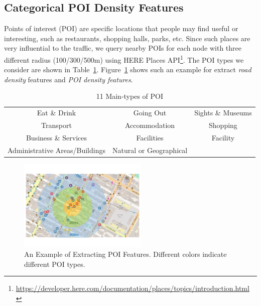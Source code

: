 \subsection{Categorical POI Density Features}
Points of interest (POI) are specific locations that people may find useful or interesting, such as restaurants, shopping halls, parks, etc.
Since such places are very influential to the traffic, we query nearby POIs for each node with three different radius (100/300/500m) using HERE Places API\footnote{\url{https://developer.here.com/documentation/places/topics/introduction.html
}}. 
The POI types we consider are shown in Table~\ref{tbl:poi}.
Figure~\ref{fig:poi} shows such an example for extract \textit{road density} features and\textit{ POI density features}.


\begin{table}[th]
	\small
	\centering
	\caption{11 Main-types of POI}
	\label{tbl:poi}
	\begin{tabular}{|ccc|}
		\hline
		Eat \& Drink                   & Going Out               & Sights \& Museums \\ 
		Transport                      & Accommodation           & Shopping          \\ 
		Business \& Services           & Facilities              & Facility          \\ 
		Administrative Areas/Buildings & Natural or Geographical &                   \\ \hline
	\end{tabular}
\end{table}




\begin{figure}[th!]
	\centering
	\includegraphics[width=0.55\textwidth]{figures/poi.pdf}
	\caption{An Example of Extracting POI Features. Different colors indicate different POI types.}
	\label{fig:poi}
\end{figure}


